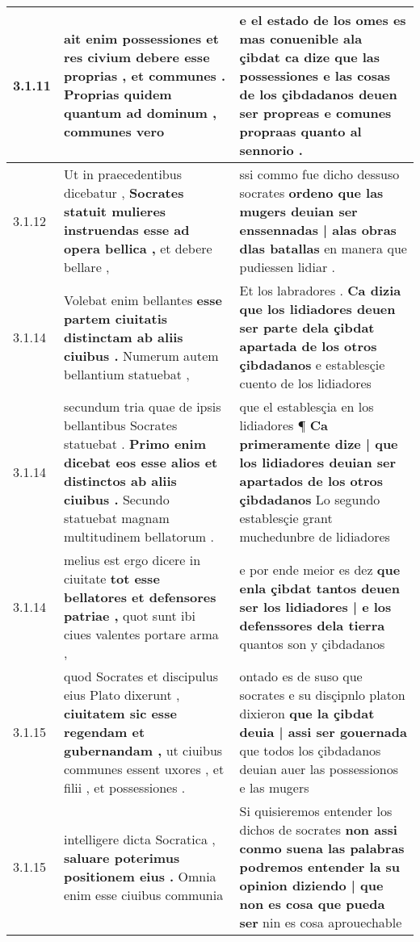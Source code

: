 \begin{tabular}{|p{1cm}|p{6.5cm}|p{6.5cm}|}
3.1.11 & ait enim possessiones \textbf{ et res civium debere esse proprias , et communes . } Proprias quidem quantum ad dominum , communes vero & e el estado de los omes es mas conuenible ala çibdat \textbf{ ca dize que las possessiones e las cosas de los çibdadanos deuen ser propreas } e comunes propraas quanto al sennorio . \\\hline
3.1.12 & Ut in praecedentibus dicebatur , \textbf{ Socrates statuit mulieres instruendas esse ad opera bellica , } et debere bellare , & ssi commo fue dicho dessuso socrates \textbf{ ordeno que las mugers deuian ser enssennadas | alas obras dlas batallas } en manera que pudiessen lidiar . \\\hline
3.1.14 & Volebat enim bellantes \textbf{ esse partem ciuitatis distinctam ab aliis ciuibus . } Numerum autem bellantium statuebat , & Et los labradores . \textbf{ Ca dizia que los lidiadores deuen ser parte dela çibdat apartada de los otros çibdadanos } e establesçie cuento de los lidiadores \\\hline
3.1.14 & secundum tria quae de ipsis bellantibus Socrates statuebat . \textbf{ Primo enim dicebat eos esse alios et distinctos ab aliis ciuibus . } Secundo statuebat magnam multitudinem bellatorum . & que el establesçia en los lidiadores ¶ \textbf{ Ca primeramente dize | que los lidiadores deuian ser apartados de los otros çibdadanos } Lo segundo establesçie grant muchedunbre de lidiadores \\\hline
3.1.14 & melius est ergo dicere in ciuitate \textbf{ tot esse bellatores et defensores patriae , } quot sunt ibi ciues valentes portare arma , & e por ende meior es dez \textbf{ que enla çibdat tantos deuen ser los lidiadores | e los defenssores dela tierra } quantos son y çibdadanos \\\hline
3.1.15 & quod Socrates et discipulus eius Plato dixerunt , \textbf{ ciuitatem sic esse regendam et gubernandam , } ut ciuibus communes essent uxores , et filii , et possessiones . & ontado es de suso que socrates e su disçipnlo platon dixieron \textbf{ que la çibdat deuia | assi ser gouernada } que todos los çibdadanos deuian auer las possessionos e las mugers \\\hline
3.1.15 & intelligere dicta Socratica , \textbf{ saluare poterimus positionem eius . } Omnia enim esse ciuibus communia & Si quisieremos entender los dichos de socrates \textbf{ non assi conmo suena las palabras podremos entender la su opinion diziendo | que non es cosa que pueda ser } nin es cosa aprouechable \\\hline

\end{tabular}
